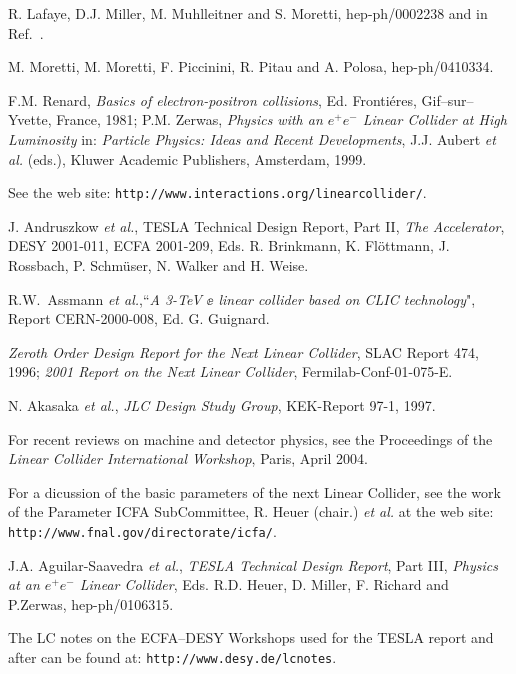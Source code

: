 \begin{thebibliography}{999}
R. Lafaye, D.J. Miller, M. Muhlleitner and S. Moretti, hep-ph/0002238 and in 
Ref.~\cite{Houches2001}.

M. Moretti, M. Moretti, F. Piccinini, R. Pitau and A. Polosa, hep-ph/0410334. 



 F.M. Renard, {\it Basics of electron-positron 
collisions}, Ed. Fronti\'eres, Gif--sur--Yvette, France, 1981; 
P.M. Zerwas, {\it Physics with an $e^+e^-$ Linear Collider at High
Luminosity} in: {\it Particle Physics: Ideas and Recent Developments}, 
J.J. Aubert {\it et al.} (eds.), Kluwer Academic Publishers, Amsterdam, 1999. 
 
 See the web site: 
{\tt http://www.interactions.org/linearcollider/}. 

 J. Andruszkow {\it et al.}, TESLA Technical Design Report, 
Part II, {\it The Accelerator}, DESY 2001-011, ECFA 2001-209, Eds. 
R. Brinkmann, K. Fl\"ottmann, J. Rossbach, P. Schm\"user, N. Walker and 
H. Weise.  

 R.W.~Assmann {\it et al.},``{\it A 3-TeV $\ee$  linear 
collider based on CLIC technology}", Report CERN-2000-008, Ed. G. Guignard. 

 {\it Zeroth Order Design Report for the Next Linear Collider},
SLAC Report 474, 1996; {\it 2001 Report on the Next Linear Collider},
Fermilab-Conf-01-075-E. 

 N. Akasaka {\it et al.}, {\it JLC Design Study Group}, 
KEK-Report 97-1, 1997.

 For recent reviews on machine and detector physics, see the
Proceedings of the  {\it Linear Collider International Workshop}, Paris,
April 2004. 

 For a dicussion of the basic parameters of the next
Linear Collider, see the work of the Parameter ICFA SubCommittee, R. Heuer 
(chair.) {\it et al.} at  the web site: 
{\tt http://www.fnal.gov/directorate/icfa/}. 


 J.A. Aguilar-Saavedra {\it et al.}, {\it TESLA Technical 
Design Report}, Part III, {\it Physics at an $e^+e^-$ Linear Collider}, 
Eds. R.D. Heuer, D. Miller, F. Richard and P.Zerwas, hep-ph/0106315.

 The LC notes on the ECFA--DESY Workshops used for
the TESLA report and after can be found at: {\tt http://www.desy.de/lcnotes}. 


\end{thebibliography}
